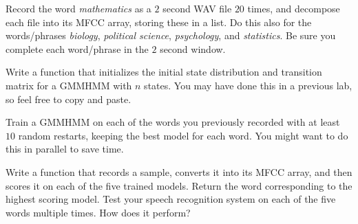 Record the word \emph{mathematics} as a $2$ second WAV file $20$ times, and decompose each file into its MFCC array, storing these in a list. Do this also for the words/phrases \emph{biology}, \emph{political science}, \emph{psychology}, and \emph{statistics}. Be sure you complete each word/phrase in the $2$ second window.

Write a function that initializes the initial state distribution and transition matrix for a GMMHMM with $n$ states. You may have done this in a previous lab, so feel free to copy and paste.

Train a GMMHMM on each of the words you previously recorded with at least $10$ random restarts, keeping the best model for each word. You might want to do this in parallel to save time.

Write a function that records a sample, converts it into its MFCC array, and then scores it on each of the five trained models. Return the word corresponding to the highest scoring model. Test your speech recognition system on each of the five words multiple times. How does it perform?
